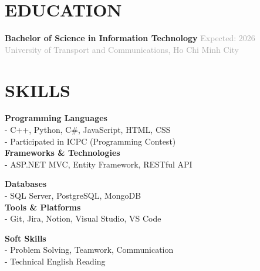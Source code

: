 \documentclass[10pt,a4paper]{article}
\begin{document}
\vspace{6pt}

\section{EDUCATION}
\noindent
\textbf{Bachelor of Science in Information Technology} \hfill \textcolor{darkgray}{\small Expected: 2026} \\[1pt]
\textcolor{darkgray}{\small University of Transport and Communications, Ho Chi Minh City}


\vspace{6pt}

\section{SKILLS}

\begin{minipage}[t]{0.5\textwidth}
    \textbf{\small Programming Languages} \\[1pt]
    - C++, Python, C\#, JavaScript, HTML, CSS \\
    - Participated in ICPC (Programming Contest) \\[4pt]
    
    \textbf{\small Frameworks \& Technologies} \\[1pt]
    - ASP.NET MVC, Entity Framework, RESTful API
\end{minipage}%
\begin{minipage}[t]{0.5\textwidth}
    \textbf{\small Databases} \\[1pt]
    - SQL Server, PostgreSQL, MongoDB \\[4pt]

    \textbf{\small Tools \& Platforms} \\[1pt]
    - Git, Jira, Notion, Visual Studio, VS Code
\end{minipage}

\vspace{8pt}

\begin{minipage}[t]{0.5\textwidth}
    \textbf{\small Soft Skills} \\[1pt]
    - Problem Solving, Teamwork, Communication \\
    - Technical English Reading
\end{minipage}
\end{document}
